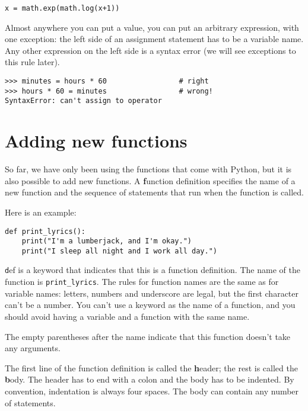 \documentclass[
DIV=11,
fontsize=13,
twoside,
headinclude=false,
titlepage=firstiscover,
abstract=true,
headsepline=true,
footsepline=true,
chapterprefix=true, %
headings=big,
bibliography=totoc,%
captions=tableheading
]{scrbook}
\theoremstyle{definition}
\begin{document}
\begin{lstlisting}
x = math.exp(math.log(x+1))
\end{lstlisting}
%
Almost anywhere you can put a value, you can put an arbitrary
expression, with one exception: the left side of an assignment
statement has to be a variable name.  Any other expression on the left
side is a syntax error (we will see exceptions to this rule
later).

\begin{lstlisting}
>>> minutes = hours * 60                 # right
>>> hours * 60 = minutes                 # wrong!
SyntaxError: can't assign to operator
\end{lstlisting}
%


\section{Adding new functions}

So far, we have only been using the functions that come with Python,
but it is also possible to add new functions.
A {\textbf function definition} specifies the name of a new function and
the sequence of statements that run when the function is called.

Here is an example:

\begin{lstlisting}
def print_lyrics():
    print("I'm a lumberjack, and I'm okay.")
    print("I sleep all night and I work all day.")
\end{lstlisting}
%
{\texttt def} is a keyword that indicates that this is a function
definition.  The name of the function is \verb"print_lyrics".  The
rules for function names are the same as for variable names: letters,
numbers and underscore are legal, but the first character
can't be a number.  You can't use a keyword as the name of a function,
and you should avoid having a variable and a function with the same
name.

The empty parentheses after the name indicate that this function
doesn't take any arguments.

The first line of the function definition is called the {\textbf header};
the rest is called the {\textbf body}.  The header has to end with a colon
and the body has to be indented.  By convention, indentation is
always four spaces.  The body can contain
any number of statements.
\end{document}
